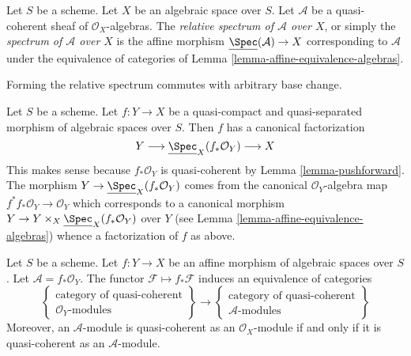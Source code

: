 \begin{definition}
\label{definition-relative-spec}
Let $S$ be a scheme. Let $X$ be an algebraic space over $S$.
Let $\mathcal{A}$ be a quasi-coherent sheaf of
$\mathcal{O}_X$-algebras. The {\it relative spectrum of $\mathcal{A}$ over
$X$}, or simply the {\it spectrum of $\mathcal{A}$ over $X$} is the
affine morphism $\underline{\Spec}(\mathcal{A}) \to X$
corresponding to $\mathcal{A}$ under the equivalence of categories of
Lemma \ref{lemma-affine-equivalence-algebras}.
\end{definition}

\noindent
Forming the relative spectrum commutes with arbitrary base change.

\begin{remark}
\label{remark-factorization-quasi-compact-quasi-separated}
Let $S$ be a scheme. Let $f : Y \to X$ be a quasi-compact and
quasi-separated morphism of algebraic spaces over $S$. Then
$f$ has a canonical factorization
$$
Y \longrightarrow \underline{\Spec}_X(f_*\mathcal{O}_Y) \longrightarrow X
$$
This makes sense because $f_*\mathcal{O}_Y$ is quasi-coherent
by Lemma \ref{lemma-pushforward}. The morphism
$Y \to \underline{\Spec}_X(f_*\mathcal{O}_Y)$ comes from
the canonical $\mathcal{O}_Y$-algebra map
$f^*f_*\mathcal{O}_Y \to \mathcal{O}_Y$ which corresponds to
a canonical morphism
$Y \to Y \times_X \underline{\Spec}_X(f_*\mathcal{O}_Y)$ over $Y$ (see
Lemma \ref{lemma-affine-equivalence-algebras}) whence a factorization
of $f$ as above.
\end{remark}

\begin{lemma}
\label{lemma-affine-equivalence-modules}
Let $S$ be a scheme.
Let $f : Y \to X$ be an affine morphism of algebraic spaces over $S$.
Let $\mathcal{A} = f_*\mathcal{O}_Y$.
The functor $\mathcal{F} \mapsto f_*\mathcal{F}$ induces
an equivalence of categories
$$
\left\{
\begin{matrix}
\text{category of quasi-coherent}\\
\mathcal{O}_Y\text{-modules}
\end{matrix}
\right\}
\longrightarrow
\left\{
\begin{matrix}
\text{category of quasi-coherent}\\
\mathcal{A}\text{-modules}
\end{matrix}
\right\}
$$
Moreover, an $\mathcal{A}$-module is
quasi-coherent as an $\mathcal{O}_X$-module if and only if
it is quasi-coherent as an $\mathcal{A}$-module.
\end{lemma}

